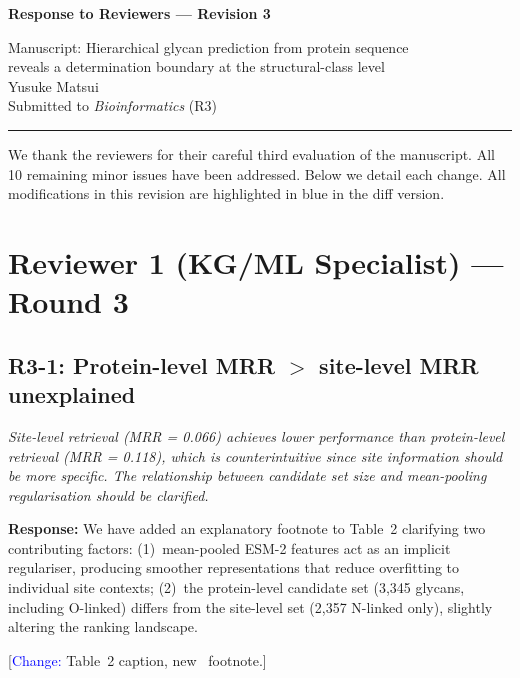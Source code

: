 \documentclass[11pt,a4paper]{article}
\newcommand{\HRule}{\rule{\linewidth}{0.4pt}}
\begin{document}
\begin{center}
{\LARGE\bfseries Response to Reviewers --- Revision 3}

\vspace{0.5em}
{\large Manuscript: Hierarchical glycan prediction from protein sequence\\
reveals a determination boundary at the structural-class level}\\[0.3em]
{\normalsize Yusuke Matsui}\\[0.3em]
{\normalsize Submitted to \textit{Bioinformatics} (R3)}
\end{center}
\HRule
\vspace{0.5em}

We thank the reviewers for their careful third evaluation of the manuscript.
All 10 remaining minor issues have been addressed. Below we detail each change.
All modifications in this revision are highlighted in blue in the diff version.

\section*{Reviewer 1 (KG/ML Specialist) --- Round 3}

\subsection*{R3-1: Protein-level MRR $>$ site-level MRR unexplained}

\textit{Site-level retrieval (MRR = 0.066) achieves lower performance than
protein-level retrieval (MRR = 0.118), which is counterintuitive since site
information should be more specific. The relationship between candidate set size
and mean-pooling regularisation should be clarified.}

\textbf{Response:} We have added an explanatory footnote to Table~2 clarifying
two contributing factors: (1)~mean-pooled ESM-2 features act as an implicit
regulariser, producing smoother representations that reduce overfitting to
individual site contexts; (2)~the protein-level candidate set (3,345 glycans,
including O-linked) differs from the site-level set (2,357 N-linked only),
slightly altering the ranking landscape.

[\textcolor{blue}{Change:} Table~2 caption, new \dag\ footnote.]

\end{document}
